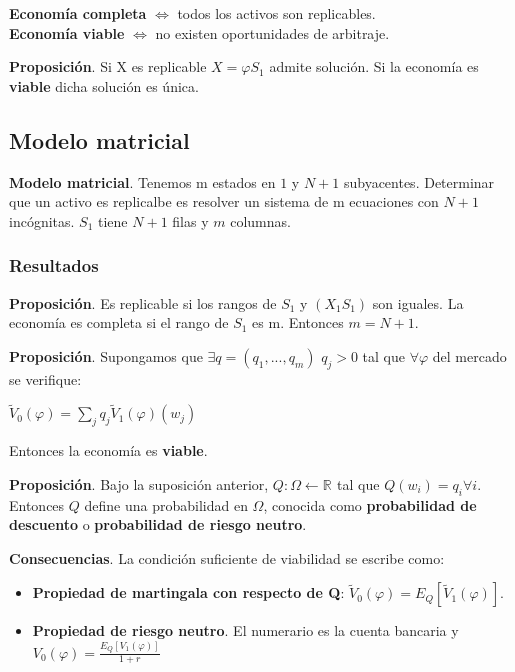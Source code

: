\documentclass[
10pt, %
a4paper, %
oneside, %
headinclude,footinclude, %
BCOR5mm, %
]{scrartcl}
\newcommand{\n}[1]{\textbf{#1}}
\newcommand{\sub}[1]{_{#1}}
\newcommand{\pot}[1]{^{#1}}
\newcommand{\f}[1]{{\large{${#1}$}}}
\newcommand{\sumatorio}[2]{\sum_{#1}^{#2}}
\newcommand{\sii}[0]{\Leftrightarrow}
\newcommand{\rn}[1]{\mathbb{R}\pot{#1}}
\newcounter{ex}
\begin{document}
			\n{Economía completa} \f{\sii} todos los activos son replicables.\\
			\n{Economía viable} \f{\sii} no existen oportunidades de arbitraje.

			\n{Proposición}. Si X es replicable \f{X = \varphi S\sub{1}} admite solución. Si la economía es \n{viable} dicha solución es única.

		\subsection{Modelo matricial}

			\n{Modelo matricial}. Tenemos m estados en \f{1} y \f{N+1} subyacentes. Determinar que un activo es replicalbe es resolver un sistema de m ecuaciones con \f{N+1} incógnitas. \f{S\sub{1}} tiene \f{N+1} filas y \f{m} columnas.

		\subsubsection{Resultados}

			\n{Proposición}. Es replicable si los rangos de \f{S\sub{1}} y \f{(X\sub{1}S\sub{1})} son iguales. La economía es completa si el rango de \f{S\sub{1}} es m. Entonces \f{m = N+1}.

			\n{Proposición}. Supongamos que \f{\exists q = (q\sub{1},...,q\sub{m})} \f{q\sub{j} > 0} tal que \f{\forall \varphi} del mercado se verifique: \begin{center} \f{\tilde{V}\sub{0}(\varphi) = \sumatorio{j}{} q\sub{j} \tilde{V}\sub{1}(\varphi)(w\sub{j})} \end{center} Entonces la economía es \n{viable}.

			\n{Proposición}. Bajo la suposición anterior, \f{Q: \Omega \leftarrow \rn{}} tal que \f{Q(w\sub{i}) = q\sub{i} \forall i}. Entonces \f{Q} define una probabilidad en \f{\Omega}, conocida como \n{probabilidad de descuento} o \n{probabilidad de riesgo neutro}.

			\n{Consecuencias}. La condición suficiente de viabilidad se escribe como: 
			\begin{itemize}
				\item \n{Propiedad de martingala con respecto de Q}: \f{\tilde{V}\sub{0}(\varphi) = E\sub{Q}[\tilde{V}\sub{1}(\varphi)]}.
				\item \n{Propiedad de riesgo neutro}. El numerario es la cuenta bancaria y \f{V\sub{0}(\varphi) = \frac{E\sub{Q}[V\sub{1}(\varphi)]}{1+r}}
			\end{itemize}
\end{document}
